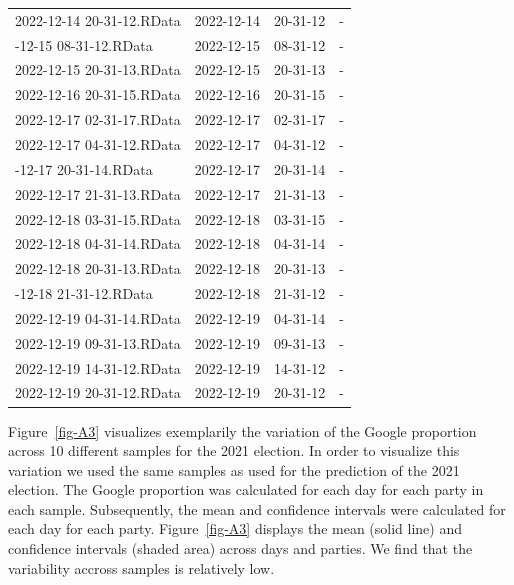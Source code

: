 \documentclass[
  letterpaper,
  DIV=11,
  numbers=noendperiod]{scrartcl}
\begin{document}
\begin{table}
\begin{tabular}{llll}
2022-12-14 20-31-12.RData & 2022-12-14 & 20-31-12 & -\\
\addlinespace
2022-12-15 08-31-12.RData & 2022-12-15 & 08-31-12 & -\\
2022-12-15 20-31-13.RData & 2022-12-15 & 20-31-13 & -\\
2022-12-16 20-31-15.RData & 2022-12-16 & 20-31-15 & -\\
2022-12-17 02-31-17.RData & 2022-12-17 & 02-31-17 & -\\
2022-12-17 04-31-12.RData & 2022-12-17 & 04-31-12 & -\\
\addlinespace
2022-12-17 20-31-14.RData & 2022-12-17 & 20-31-14 & -\\
2022-12-17 21-31-13.RData & 2022-12-17 & 21-31-13 & -\\
2022-12-18 03-31-15.RData & 2022-12-18 & 03-31-15 & -\\
2022-12-18 04-31-14.RData & 2022-12-18 & 04-31-14 & -\\
2022-12-18 20-31-13.RData & 2022-12-18 & 20-31-13 & -\\
\addlinespace
2022-12-18 21-31-12.RData & 2022-12-18 & 21-31-12 & -\\
2022-12-19 04-31-14.RData & 2022-12-19 & 04-31-14 & -\\
2022-12-19 09-31-13.RData & 2022-12-19 & 09-31-13 & -\\
2022-12-19 14-31-12.RData & 2022-12-19 & 14-31-12 & -\\
2022-12-19 20-31-12.RData & 2022-12-19 & 20-31-12 & -\\
\bottomrule
\end{tabular}
\endgroup{}
\end{table}

Figure~\ref{fig-A3} visualizes exemplarily the variation of the Google
proportion across 10 different samples for the 2021 election. In order
to visualize this variation we used the same samples as used for the
prediction of the 2021 election. The Google proportion was calculated
for each day for each party in each sample. Subsequently, the mean and
confidence intervals were calculated for each day for each party.
Figure~\ref{fig-A3} displays the mean (solid line) and confidence
intervals (shaded area) across days and parties. We find that the
variability accross samples is relatively low.
\end{document}
